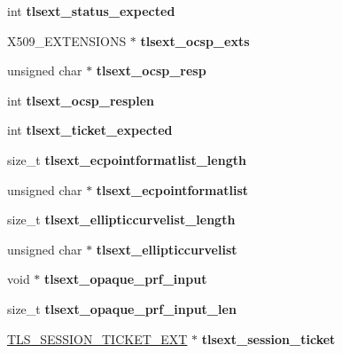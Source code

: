 \begin{DoxyCompactItemize}
int {\bfseries tlsext\+\_\+status\+\_\+expected}
\item 
\mbox{\label{structssl__st_a234c465dc9c34dde4ac3cc24a79467a1}} 
X509\+\_\+\+E\+X\+T\+E\+N\+S\+I\+O\+NS $\ast$ {\bfseries tlsext\+\_\+ocsp\+\_\+exts}
\item 
\mbox{\label{structssl__st_ab54a13d08a8b115b2a7897c9213b1fb7}} 
unsigned char $\ast$ {\bfseries tlsext\+\_\+ocsp\+\_\+resp}
\item 
\mbox{\label{structssl__st_a4a86cdf17eb779e0d6e467105103eb5f}} 
int {\bfseries tlsext\+\_\+ocsp\+\_\+resplen}
\item 
\mbox{\label{structssl__st_ac3163b212ec333ebcfba794e683be1d2}} 
int {\bfseries tlsext\+\_\+ticket\+\_\+expected}
\item 
\mbox{\label{structssl__st_a1661bf580598984c531b321c0a005d37}} 
size\+\_\+t {\bfseries tlsext\+\_\+ecpointformatlist\+\_\+length}
\item 
\mbox{\label{structssl__st_a000e3639718d5d28e610cca71c0ee995}} 
unsigned char $\ast$ {\bfseries tlsext\+\_\+ecpointformatlist}
\item 
\mbox{\label{structssl__st_ac0a9a07be2d0e0f83b0844b61e82d06f}} 
size\+\_\+t {\bfseries tlsext\+\_\+ellipticcurvelist\+\_\+length}
\item 
\mbox{\label{structssl__st_af2e7ed3a280b3afb8d42ea9f9aa45637}} 
unsigned char $\ast$ {\bfseries tlsext\+\_\+ellipticcurvelist}
\item 
\mbox{\label{structssl__st_a25e40e842200910b02ec2191da0f5f62}} 
void $\ast$ {\bfseries tlsext\+\_\+opaque\+\_\+prf\+\_\+input}
\item 
\mbox{\label{structssl__st_a83b5b006619d33cb3bd36b0b03288e9f}} 
size\+\_\+t {\bfseries tlsext\+\_\+opaque\+\_\+prf\+\_\+input\+\_\+len}
\item 
\mbox{\label{structssl__st_a88b1275f3d5733e3e856fe8c09d18566}} 
\hyperlink{structtls__session__ticket__ext__st}{T\+L\+S\+\_\+\+S\+E\+S\+S\+I\+O\+N\+\_\+\+T\+I\+C\+K\+E\+T\+\_\+\+E\+XT} $\ast$ {\bfseries tlsext\+\_\+session\+\_\+ticket}

\end{DoxyCompactItemize}
